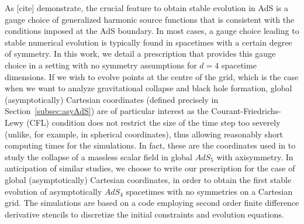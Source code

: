 \documentclass[a4paper,11pt]{article}
\begin{document}

As [cite] demonstrate, the crucial feature to obtain stable evolution in AdS is a gauge choice of generalized harmonic source functions that is consistent with the conditions imposed at the AdS boundary.
In most cases, a gauge choice leading to stable numerical evolution is typically found in spacetimes with a certain degree of symmetry.
In this work, we detail a prescription that provides this gauge choice in a setting with no symmetry assumptions for $d=4$ spacetime dimensions. 
If we wish to evolve points at the centre of the grid, which is the case when we want to analyze gravitational collapse and black hole formation, global (asymptotically) Cartesian coordinates (defined precisely in Section~\ref{subsec:asyAdS}) are of particular interest as the Courant-Friedrichs-Lewy (CFL) condition does not restrict the size of the time step too severely (unlike, for example, in spherical coordinates), thus allowing reasonably short computing times for the simulations.
In fact, these are the coordinates used in \cite{Bantilan:2017kok} to study the collapse of a massless scalar field in global $AdS_5$ with axisymmetry.
In anticipation of similar studies, we choose to write our prescription for the case of global (asymptotically) Cartesian coordinates, in order to obtain the first stable evolution of asymptotically $AdS_4$ spacetimes with no symmetries on a Cartesian grid.
The simulations are based on a code employing second order finite difference derivative stencils to discretize the initial constraints and evolution equations.
\end{document}
